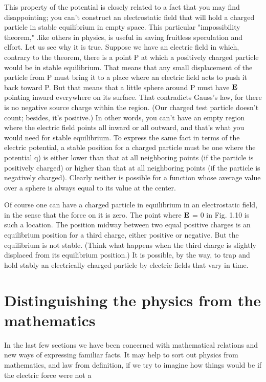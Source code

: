 This property of the potential is closely related to a fact that you
may find disappointing; you can't construct an electrostatic field that
will hold a charged particle in stable equilibrium in empty space.
This particular "impossibility theorem," .like others in physics, is
useful in saving fruitless speculation and elfort. Let us see why it
is true. Suppose we have an electric field in which, contrary to the
theorem, there is a point P at which a positively charged particle
would be in stable equilibrium. That means that any small displacement
of the particle from P must bring it to a place where an electric
field acts to push it back toward P. But that means that a little sphere
around P must have $\mathbf{E}$ pointing inward everywhere on its surface.
That contradicts Gauss's law, for there is no negative source charge
within the region. (Our charged test particle doesn't count; besides,
it's positive.) In other words, you can't have an empty region where
the electric field points all inward or all outward, and that's what you
would need for stable equilibrium. To express the same fact in terms
of the electric potential, a stable position for a charged particle must
be one where the potential q) is either lower than that at all neighboring
points (if the particle is positively charged) or higher than that
at all neighboring points (if the particle is negatively charged).
Clearly neither is possible for a function whose average value over a
sphere is always equal to its value at the center.

Of course one can have a charged particle in equilibrium in an electrostatic
field, in the sense that the force on it is zero. The point
where $\mathbf{E}$ = 0 in Fig. 1.10 is such a location. The position midway
between two equal positive charges is an equilibrium position for a
third charge, either positive or negative. But the equilibrium is not
stable. (Think what happens when the third charge is slightly displaced
from its equilibrium position.) It is possible, by the way,
to trap and hold stably an electrically charged particle by electric
fields that vary in time.

\section{Distinguishing the physics from the mathematics}

In the last few sections we have been concerned with mathematical
relations and new ways of expressing familiar facts. It may help to
sort out physics from mathematics, and law from definition, if we
try to imagine how things would be if the electric force were not a

